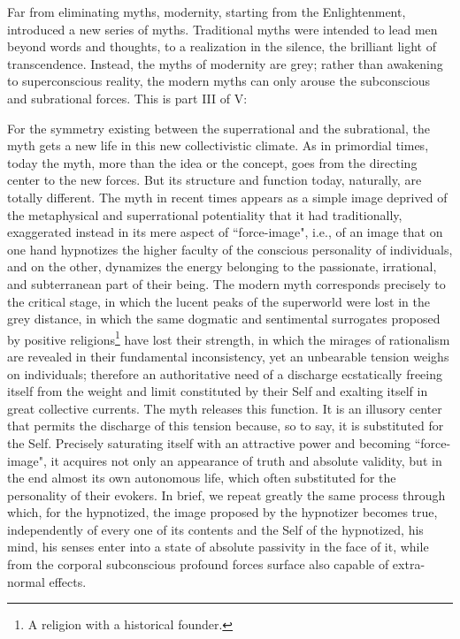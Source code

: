 \begin{quotex}
Far from eliminating myths, modernity, starting from the Enlightenment, introduced a new series of myths. Traditional myths were intended to lead men beyond words and thoughts, to a realization in the silence, the brilliant light of transcendence. Instead, the myths of modernity are grey; rather than awakening to superconscious reality, the modern myths can only arouse the subconscious and subrational forces. This is part III of V: 

\end{quotex}
For the symmetry existing between the superrational and the subrational, the myth gets a new life in this new collectivistic climate. As in primordial times, today the myth, more than the idea or the concept, goes from the directing center to the new forces. But its structure and function today, naturally, are totally different. The myth in recent times appears as a simple image deprived of the metaphysical and superrational potentiality that it had traditionally, exaggerated instead in its mere aspect of ``force-image", i.e., of an image that on one hand hypnotizes the higher faculty of the conscious personality of individuals, and on the other, dynamizes the energy belonging to the passionate, irrational, and subterranean part of their being. The modern myth corresponds precisely to the critical stage, in which the lucent peaks of the superworld were lost in the grey distance, in which the same dogmatic and sentimental surrogates proposed by positive religions\footnote{A religion with a historical founder.} have lost their strength, in which the mirages of rationalism are revealed in their fundamental inconsistency, yet an unbearable tension weighs on individuals; therefore an authoritative need of a discharge ecstatically freeing itself from the weight and limit constituted by their Self and exalting itself in great collective currents. The myth releases this function. It is an illusory center that permits the discharge of this tension because, so to say, it is substituted for the Self. Precisely saturating itself with an attractive power and becoming ``force-image", it acquires not only an appearance of truth and absolute validity, but in the end almost its own autonomous life, which often substituted for the personality of their evokers. In brief, we repeat greatly the same process through which, for the hypnotized, the image proposed by the hypnotizer becomes true, independently of every one of its contents and the Self of the hypnotized, his mind, his senses enter into a state of absolute passivity in the face of it, while from the corporal subconscious profound forces surface also capable of extra-normal effects.

